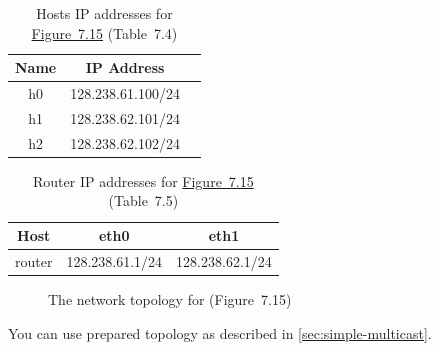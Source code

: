 \documentclass{../UTNetLab}
\begin{document}
    \begin{table}[H]
        \caption{Hosts IP addresses for \hyperref[fig:7.15]{Figure~7.15} (Table~7.4)}
        \label{tab:7.4}
        \centering
        \begin{tabular}{ *3c }
            \hline \hline
            Name & IP Address \\
            \hline
                h0 & 128.238.61.100/24 \\
                h1 & 128.238.62.101/24 \\
                h2 & 128.238.62.102/24 \\
            \hline \hline
            \end{tabular}
    \end{table}

    \begin{table}[H]
        \caption{Router IP addresses for \hyperref[fig:7.15]{Figure~7.15} (Table~7.5)}
        \label{tab:7.5}
        \centering
        \begin{tabular}{ *3c }
            \hline \hline
            Host & eth0 & eth1 \\
            \hline
            router & 128.238.61.1/24 & 128.238.62.1/24 \\
            \hline \hline
            \end{tabular}
    \end{table}

    \begin{figure}[H]
        \centering
        \caption{The network topology for  (Figure~7.15)}
        \label{fig:7.15}
    \end{figure}

    You can use prepared topology as described in \autoref{sec:simple-multicast}.    
\end{document}
